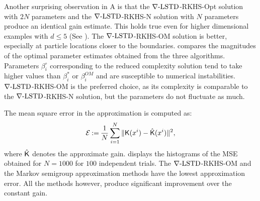 Another surprising observation in  A is that the $\nabla\text{-LSTD}$-RKHS-Opt solution with $2N$ parameters and the $\nabla\text{-LSTD}$-RKHS-N solution with $N$ parameters produce an identical gain estimate. This holds true even for higher dimensional examples with $d\leq 5$ (See ). The $\nabla\text{-LSTD}$-RKHS-OM solution is better, especially at particle locations closer to the boundaries.  compares the magnitudes of the optimal parameter estimates obtained from the three algorithms. Parameters $\beta_i^\circ$ corresponding to the reduced complexity solution tend to take higher values than $\beta_i^*$ or $\beta_i^{OM}$ and are susceptible to numerical instabilities. $\nabla\text{-LSTD}$-RKHS-OM is the preferred choice, as its complexity is comparable to the $\nabla\text{-LSTD}$-RKHS-N solution, but the parameters do not fluctuate as much. 

The mean square error in the approximation is computed as:
\begin{equation}
\mathcal{E} \eqdef \frac{1}{N} \sum_{i=1}^N \|\kFPF(x^i)  - \hat{\kFPF}(x^i) \|^2,
\label{e:gain_mse}
\end{equation}
where $\hat{\text{\sf K}}$ denotes the approximate gain.  displays the histograms of the MSE obtained for $N=1000$ for $100$ independent trials. The $\nabla\text{-LSTD}$-RKHS-OM and the Markov semigroup approximation methods have the lowest approximation error. All the methods however, produce significant improvement over the constant gain. 


